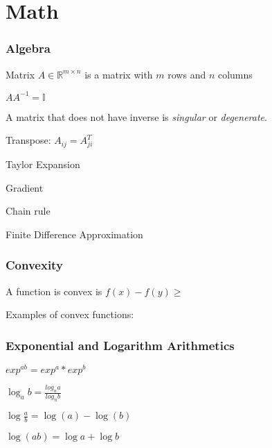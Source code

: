 \part{Math}
\section{Algebra}

Matrix $A \in\mathbb R^{m\times n}$ is a matrix with $m$ rows and $n$ columns

$AA^{-1}=\mathbb{I}$

A matrix that does not have inverse is \emph{singular} or \emph{degenerate}.

Transpose: $A_{ij} = A_{ji}^T$

Taylor Expansion

Gradient

Chain rule

Finite Difference Approximation

\section{Convexity}

A function is convex is $f(x) - f(y) \ge $

Examples of convex functions: 

\section{Exponential and Logarithm Arithmetics}

$exp^{ab} = exp^a*exp^b$

$\log_ab = \frac{log_n a}{log_n b}$

$\log\frac{a}{b} = \log(a) -\log(b)$

$\log(ab) = \log a + \log b$
